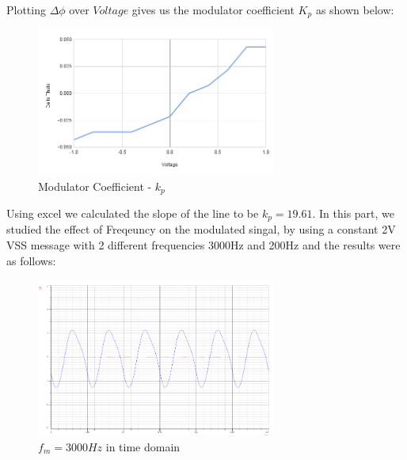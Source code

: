 \documentclass[12pt]{article}
\begin{document}
\begin{table}[H]
    \caption{PM Modulator Coefficient - $k_p$}
    \label{tab:my-table}
\end{table}
Plotting $\Delta \phi$ over $Voltage$ gives us the modulator coefficient $K_p$ as shown below:
\begin{figure}[H]
    \centering
    \includegraphics[width=0.7\textwidth]{assets/chart (14).png}
    \caption{Modulator Coefficient - $k_p$}
\end{figure}
Using excel we calculated the slope of the line to be $k_p = 19.61$.
In this part, we studied the effect of Freqeuncy on the modulated singal, by using a constant 2V VSS message with 2 different frequencies 3000Hz and 200Hz and the results were as follows:
\begin{figure}[H]
    \centering
    \includegraphics[width=0.7\textwidth]{assets/p2.png}
    \caption{$f_m = 3000Hz$ in time domain}
\end{figure}
\end{document}
